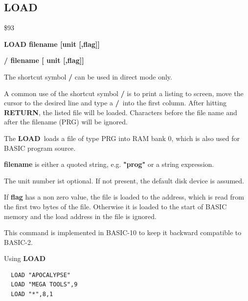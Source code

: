 \subsection{LOAD}
\begin{description}[leftmargin=2cm,style=nextline]
\item [Token:] \$93
\item [Format:] {\bf LOAD filename [unit [,flag]]}
\item [Format:] {\bf / filename [ unit [,flag]]}
\item [Usage:]

   The shortcut symbol {\bf /} can be used in direct mode only.

   A common use of the shortcut symbol {\bf /} is to print
   a listing to screen, move the cursor to the desired line
   and type a {\bf /} into the first column.
   After hitting {\bf RETURN}, the listed file will be loaded.
   Characters before the file name and after the filename (PRG)
   will be ignored.

   The {\bf LOAD} loads a file of type
   PRG into RAM bank 0, which is also used for BASIC program source.

   {\bf filename} is either a quoted string, e.g. {\bf "prog"} or
   a string expression.

   The unit number ist optional.
   If not present, the default disk device is assumed.

   If {\bf flag} has a non zero value, the file is loaded to
   the address, which is read from the first two bytes of the file.
   Otherwise it is loaded to the start of BASIC memory and
   the load address in the file is ignored.

\item [Remarks:]
   This command is implemented in BASIC-10 to keep it backward
   compatible to BASIC-2.

\item [Example:] Using {\bf LOAD}
\begin{tcolorbox}[colback=black,coltext=white]
\verbatimfont{\codefont}
\begin{verbatim}
  LOAD "APOCALYPSE"
  LOAD "MEGA TOOLS",9
  LOAD "*",8,1
\end{verbatim}
\end{tcolorbox}
\end{description}


\newpage
